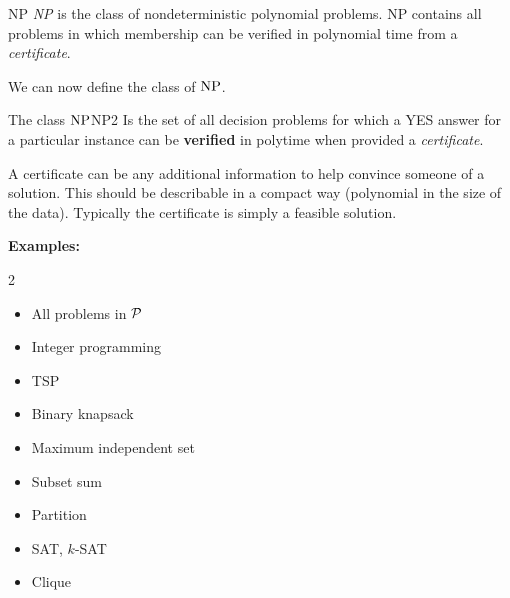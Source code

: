 \begin{definition}{NP}{}
\emph{NP} is the class of nondeterministic polynomial problems.  NP contains all problems in which membership can be verified in polynomial time from a \emph{certificate}.
\end{definition}

We can now define the class of $\mbox{NP}$.  
	
\begin{definition}{The class $\mbox{NP}$}{NP2}
Is the set of all decision problems for which a YES answer for a  
particular instance can be {\bf verified} in polytime when provided a \emph{certificate}.

A certificate can be any additional information to help convince someone of a solution.  This should be describable in a compact way (polynomial in the size of the data).  Typically the certificate is simply a feasible solution.
\end{definition}
	
	{\bf Examples:}

\begin{multicols}{2}
\begin{itemize}
\item All problems in $\mathcal{P}$
\item Integer programming
\item TSP
\item Binary knapsack
\item Maximum independent set
\item Subset sum
\item Partition
\item SAT, $k$-SAT
\item Clique
\end{itemize}
\end{multicols}

